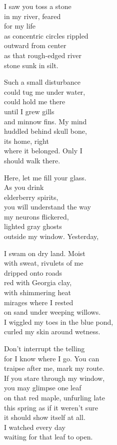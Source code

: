 \documentclass[twoside,10pt]{book}
\begin{document}
I saw you toss a stone\\
in my river, feared\\
for my life\\
as concentric circles rippled\\
outward from center\\
as that rough-edged river\\
stone sunk in silt.

Such a small disturbance\\
could tug me under water,\\
could hold me there\\
until I grew gills\\
and minnow fins. My mind\\
huddled behind skull bone,\\
its home, right\\
where it belonged. Only I\\
should walk there.

Here, let me fill your glass.\\
As you drink\\
elderberry spirits,\\
you will understand the way\\
my neurons flickered,\\
lighted gray ghosts\\
outside my window. Yesterday,

I swam on dry land. Moist\\
with sweat, rivulets of me\\
dripped onto roads\\
red with Georgia clay,\\
with shimmering heat\\
mirages where I rested\\
on sand under weeping willows.\\
I wiggled my toes in the blue pond,\\
curled my skin around wetness.

Don't interrupt the telling\\
for I know where I go. You can\\
traipse after me, mark my route.\\
If you stare through my window,\\
you may glimpse one leaf\\
on that red maple, unfurling late\\
this spring as if it weren't sure\\
it should show itself at all.\\
I watched every day\\
waiting for that leaf to open.
\end{document}
